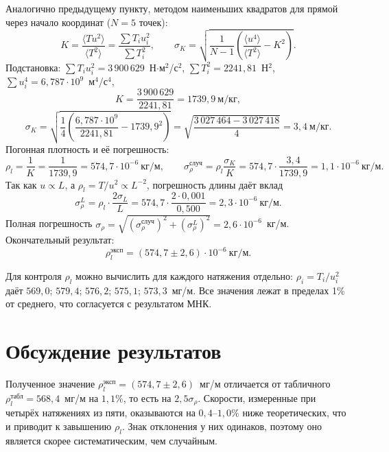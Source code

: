 \documentclass[12pt,a4paper]{article}
\begin{document}
Аналогично предыдущему пункту, методом наименьших квадратов для прямой через начало координат ($N=5$ точек):
\begin{equation}
    K=\frac{\langle Tu^2\rangle}{\langle T^2\rangle}=\frac{\sum T_iu_i^2}{\sum T_i^2},
    \qquad
    \sigma_K=\sqrt{\frac{1}{N-1}\left(\frac{\langle u^4\rangle}{\langle T^2\rangle}-K^2\right)}.
\end{equation}
Подстановка: $\sum T_iu_i^2=3\,900\,629$~Н$\cdot$м$^2$/с$^2$, $\sum T_i^2=2241{,}81$~Н$^2$, $\sum u_i^4=6{,}787\cdot10^{9}$~м$^4$/с$^4$,
\begin{equation*}
    K=\frac{3\,900\,629}{2241{,}81}=1739{,}9~\text{м/кг},
\end{equation*}
\begin{equation*}
    \sigma_K=\sqrt{\frac{1}{4}\left(\frac{6{,}787\cdot10^{9}}{2241{,}81}-1739{,}9^2\right)}
    =\sqrt{\frac{3\,027\,464-3\,027\,418}{4}}=3{,}4~\text{м/кг}.
\end{equation*}
Погонная плотность и её погрешность:
\begin{equation*}
    \rho_l=\frac{1}{K}=\frac{1}{1739{,}9}=574{,}7\cdot10^{-6}~\text{кг/м},\qquad
    \sigma_{\rho}^{\text{случ}}=\rho_l\frac{\sigma_K}{K}=574{,}7\cdot\frac{3{,}4}{1739{,}9}=1{,}1\cdot10^{-6}~\text{кг/м}.
\end{equation*}
Так как $u\propto L$, а $\rho_l=T/u^2\propto L^{-2}$, погрешность длины даёт вклад
\begin{equation*}
    \sigma_{\rho}^{L}=\rho_l\cdot\frac{2\sigma_L}{L}=574{,}7\cdot\frac{2\cdot0{,}001}{0{,}500}=2{,}3\cdot10^{-6}~\text{кг/м}.
\end{equation*}
Полная погрешность $\sigma_\rho=\sqrt{(\sigma_\rho^{\text{случ}})^2+(\sigma_\rho^{L})^2}=2{,}6\cdot10^{-6}$~кг/м. Окончательный результат:
\begin{equation}
    \rho_l^{\text{эксп}} = (574{,}7\pm2{,}6)\cdot10^{-6}\ \text{кг/м}.
\end{equation}

Для контроля $\rho_l$ можно вычислить для каждого натяжения отдельно: $\rho_i=T_i/u_i^2$ даёт $569{,}0$; $579{,}4$; $576{,}2$; $575{,}1$; $573{,}3$~мг/м. Все значения лежат в пределах 1\% от среднего, что согласуется с результатом МНК.

\section{Обсуждение результатов}

Полученное значение $\rho_l^{\text{эксп}}=(574{,}7\pm2{,}6)$~мг/м отличается от табличного $\rho_l^{\text{табл}}=568{,}4$~мг/м на $1{,}1\%$, то есть на $2{,}5\sigma_\rho$. Скорости, измеренные при четырёх натяжениях из пяти, оказываются на $0{,}4$--$1{,}0\%$ ниже теоретических, что и приводит к завышению $\rho_l$. Знак отклонения у них одинаков, поэтому оно является скорее систематическим, чем случайным.
\end{document}

